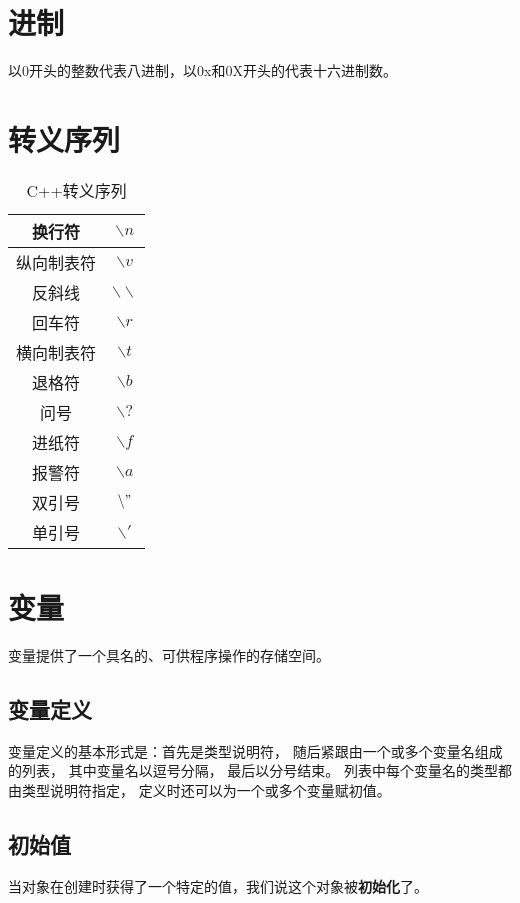 \section{进制}
以0开头的整数代表八进制，以0x和0X开头的代表十六进制数。

\section{转义序列}
\begin{table}[hbpt]
  \centering
  \begin{tabular}{cc}\hline\hline
    换行符 & $\backslash{n}$ \\\hline
    纵向制表符 & $\backslash{v}$ \\\hline
    反斜线 & $\backslash{\backslash}$ \\\hline
    回车符 & $\backslash{r}$ \\\hline
    横向制表符 & $\backslash{t}$ \\\hline
    退格符 & $\backslash{b}$ \\\hline
    问号 & $\backslash{?}$ \\\hline
    进纸符 & $\backslash{f}$ \\\hline
    报警符 & $\backslash{a}$ \\\hline
    双引号 & $\backslash{"}$ \\\hline
    单引号 & $\backslash{'}$ \\\hline\hline
  \end{tabular}
  \caption{C++转义序列}
\end{table}

\section{变量}
变量提供了一个具名的、可供程序操作的存储空间。
\subsection{变量定义}
变量定义的基本形式是：首先是类型说明符，
随后紧跟由一个或多个变量名组成的列表，%
其中变量名以逗号分隔，%
最后以分号结束。%
列表中每个变量名的类型都由类型说明符指定，%
定义时还可以为一个或多个变量赋初值。%
\subsection{初始值}
当对象在创建时获得了一个特定的值，我们说这个对象被{\bfseries{初始化}}了。\\%
{\color{red}{初始化不是赋值，初始化的含义是创建变量时赋予一个初始值，%
    而赋值的含义是把对象的当前值擦除，而以一个新值来替代。%
    一个调用拷贝构造函数，一个调用operator=运算符来完成。}}

